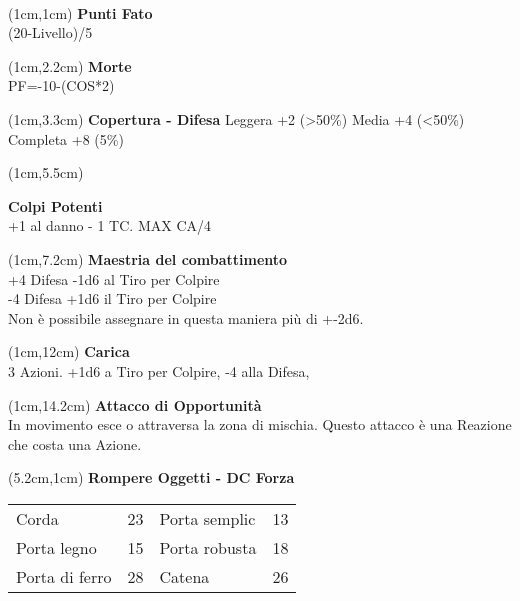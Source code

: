 \documentclass[a4paper,12 pt,openany]{book}
\begin{document}
~\newpage

\begin{textblock*}{4cm}(1cm,1cm) %
	{\textbf{Punti Fato}\\
	(20-Livello)/5}
\end{textblock*}

	\begin{textblock*}{4cm}(1cm,2.2cm) %
		{\textbf{Morte}\\
			PF=-10-(COS*2)}
	\end{textblock*}

\begin{textblock*}{4cm}(1cm,3.3cm) %
\textbf{Copertura - Difesa}
Leggera +2 (>50\%)
Media +4 (<50\%)
Completa +8 (5\%)
	\end{textblock*}

\begin{textblock*}{4cm}(1cm,5.5cm) %

\textbf{Colpi Potenti}\\
+1 al danno - 1 TC. MAX CA/4

	\end{textblock*}

\begin{textblock*}{4cm}(1cm,7.2cm) %
\textbf{Maestria del combattimento}\\
+4 Difesa -1d6 al Tiro per Colpire\\
-4 Difesa +1d6 il Tiro per Colpire \\
Non è possibile assegnare in questa maniera più di +-2d6.
	\end{textblock*}


\begin{textblock*}{4cm}(1cm,12cm) %
\textbf{Carica}\\
3 Azioni. +1d6 a Tiro per Colpire, -4 alla Difesa,
\end{textblock*}

\begin{textblock*}{4cm}(1cm,14.2cm) %
	\textbf{Attacco di Opportunità}\\
In movimento esce o attraversa la zona di mischia.
Questo attacco è una Reazione che costa una Azione.
\end{textblock*}


\begin{textblock*}{8.5cm}(5.2cm,1cm) %
	\textbf{Rompere Oggetti - DC Forza}\\
	\begin{tabular}{ll|ll}
		Corda   		   & 23&	Porta semplic          & 13\\
		Porta legno        & 15&	Porta robusta          & 18\\
		Porta di ferro     & 28&	Catena                 & 26 \\
	\end{tabular}

\end{textblock*}
\end{document}
